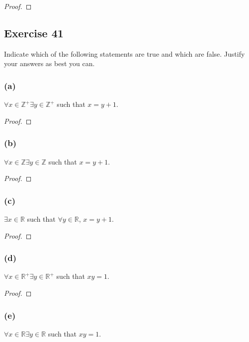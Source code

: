 \documentclass[14pt]{extarticle}
\newcommand{\R}{\mathbb{R}}
\newcommand{\Z}{\mathbb{Z}}
\newcommand{\fa}{\forall}
\newcommand{\te}{\exists}
\begin{document}
\begin{proof}

\end{proof}

\subsection{Exercise 41}
Indicate which of the following statements are true and which are false. Justify your answers as best you can.

\subsubsection{(a)}
$\fa x \in \Z^+ \te y \in \Z^+$ such that $x = y + 1$.

\begin{proof}

\end{proof}

\subsubsection{(b)}
$\fa x \in \Z \te y \in \Z$ such that $x = y + 1$.

\begin{proof}

\end{proof}

\subsubsection{(c)}
$\te x \in \R$ such that $\fa y \in \R$, $x = y + 1$.

\begin{proof}

\end{proof}

\subsubsection{(d)}
$\fa x \in \R^+ \te y \in \R^+$ such that $xy = 1$.

\begin{proof}

\end{proof}

\subsubsection{(e)}
$\fa x \in \R \te y \in \R$ such that $xy = 1$.
\end{document}
